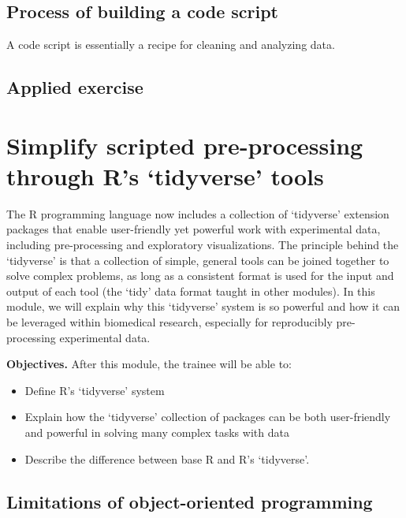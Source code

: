 \documentclass[]{tufte-book}
\providecommand{\tightlist}{%
  \setlength{\itemsep}{0pt}\setlength{\parskip}{0pt}}
\begin{document}
\hypertarget{process-of-building-a-code-script}{%
\subsection{Process of building a code script}\label{process-of-building-a-code-script}}

A code script is essentially a recipe for cleaning and analyzing data.

\hypertarget{applied-exercise-4}{%
\subsection{Applied exercise}\label{applied-exercise-4}}

\hypertarget{module14}{%
\section{Simplify scripted pre-processing through R's `tidyverse' tools}\label{module14}}

The R programming language now includes a collection of `tidyverse' extension
packages that enable user-friendly yet powerful work with experimental data,
including pre-processing and exploratory visualizations. The principle behind
the `tidyverse' is that a collection of simple, general tools can be joined
together to solve complex problems, as long as a consistent format is used for
the input and output of each tool (the `tidy' data format taught in other
modules). In this module, we will explain why this `tidyverse' system is so
powerful and how it can be leveraged within biomedical research, especially for
reproducibly pre-processing experimental data.

\textbf{Objectives.} After this module, the trainee will be able to:

\begin{itemize}
\tightlist
\item
  Define R's `tidyverse' system
\item
  Explain how the `tidyverse' collection of packages can be both user-friendly
  and powerful in solving many complex tasks with data
\item
  Describe the difference between base R and R's `tidyverse'.
\end{itemize}

\hypertarget{limitations-of-object-oriented-programming}{%
\subsection{Limitations of object-oriented programming}\label{limitations-of-object-oriented-programming}}
\end{document}
